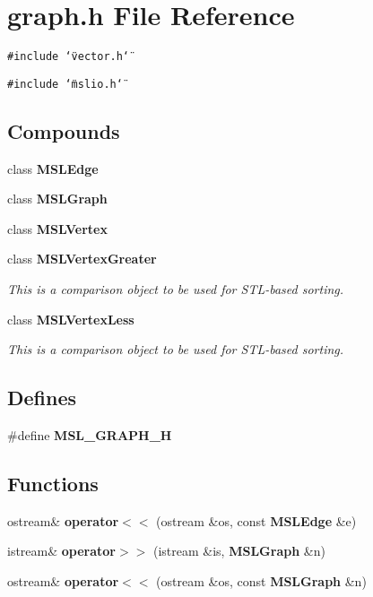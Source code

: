 \section{graph.h File Reference}
\label{graph_8h}
{\tt \#include \char`\"{}vector.h\char`\"{}}\par
{\tt \#include \char`\"{}mslio.h\char`\"{}}\par
\subsection*{Compounds}
\begin{CompactItemize}
\item 
class {\bf MSLEdge}
\item 
class {\bf MSLGraph}
\item 
class {\bf MSLVertex}
\item 
class {\bf MSLVertex\-Greater}
\begin{CompactList}\small\item\em This is a comparison object to be used for STL-based sorting.\item\end{CompactList}\item 
class {\bf MSLVertex\-Less}
\begin{CompactList}\small\item\em This is a comparison object to be used for STL-based sorting.\item\end{CompactList}\end{CompactItemize}
\subsection*{Defines}
\begin{CompactItemize}
\item 
\#define {\bf MSL\_\-GRAPH\_\-H}
\end{CompactItemize}
\subsection*{Functions}
\begin{CompactItemize}
\item 
ostream\& {\bf operator$<$$<$} (ostream \&os, const {\bf MSLEdge} \&e)
\item 
istream\& {\bf operator$>$$>$} (istream \&is, {\bf MSLGraph} \&n)
\item 
ostream\& {\bf operator$<$$<$} (ostream \&os, const {\bf MSLGraph} \&n)
\end{CompactItemize}


